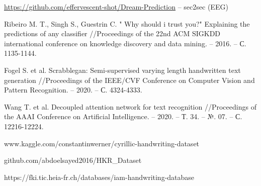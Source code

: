 \documentclass[12pt]{article}
\begin{document}
\url{https://github.com/effervescent-shot/Dream-Prediction} -- sec2sec (EEG)


\begin{thebibliography}{9}
    Ribeiro M. T., Singh S., Guestrin C. " Why should i trust you?" 
    Explaining the predictions of any classifier //Proceedings of the 22nd ACM SIGKDD 
    international conference on knowledge discovery and data mining. – 2016. – С. 1135-1144.

    Fogel S. et al. Scrabblegan: Semi-supervised varying length handwritten
    text generation //Proceedings of the IEEE/CVF Conference on 
    Computer Vision and Pattern Recognition. – 2020. – С. 4324-4333.

    Wang T. et al. Decoupled attention network for text recognition 
    //Proceedings of the AAAI Conference on Artificial Intelligence. – 2020. – Т. 34. – №. 07. – С. 12216-12224.

    www.kaggle.com/constantinwerner/cyrillic-handwriting-dataset

    github.com/abdoelsayed2016/HKR\_Dataset

    https://fki.tic.heia-fr.ch/databases/iam-handwriting-database

\end{thebibliography}
\end{document}
